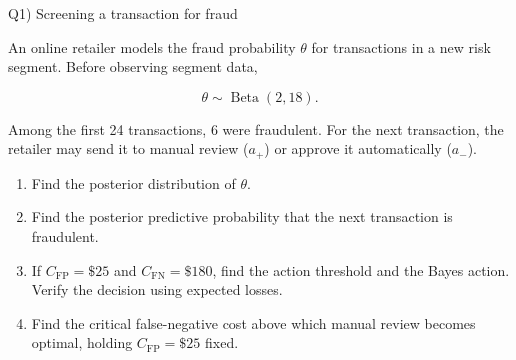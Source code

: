\documentclass[aspectratio=43,10pt]{beamer}
\newcommand{\CFP}{C_{\mathrm{FP}}}
\newcommand{\CFN}{C_{\mathrm{FN}}}
\begin{document}
\begin{frame}{Q1) Screening a transaction for fraud}

  An online retailer models the fraud probability $\theta$ for
  transactions in a new risk segment. Before observing segment data,

  \[
  \theta\sim\operatorname{Beta}(2,18).
  \]

  Among the first 24 transactions, 6 were fraudulent. For the next
  transaction, the retailer may send it to manual review ($a_+$) or
  approve it automatically ($a_-$).

  \vspace{0.15cm}

  \begin{enumerate}
    \item[a.] Find the posterior distribution of $\theta$.

    \item[b.] Find the posterior predictive probability that the next
          transaction is fraudulent.

    \item[c.] If $\CFP=\$25$ and $\CFN=\$180$, find the action threshold
          and the Bayes action. Verify the decision using expected losses.

    \item[d.] Find the critical false-negative cost above which manual review
          becomes optimal, holding $\CFP=\$25$ fixed.
  \end{enumerate}

\end{frame}
\end{document}
